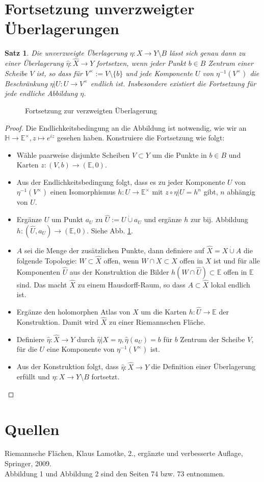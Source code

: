 \documentclass[12pt,a4paper]{article}
\theoremstyle{plain}
\newtheorem*{Satz}[Theorem]{Satz}
\newcommand{\cupdot}{\mathbin{\dot{\cup}}}
\numberwithin{equation}{section}
\begin{document}
\section*{Fortsetzung unverzweigter Überlagerungen}
\begin{Satz} Die unverzweigte Überlagerung $\eta: X\rightarrow Y\setminus B$ lässt sich genau dann zu einer Überlagerung $\hat{\eta}: \hat{X} \rightarrow Y$ fortsetzen, wenn jeder Punkt $b\in B$ Zentrum einer Scheibe $V$ ist, so dass für $V^\times:=V\setminus\{b\}$ und jede Komponente $U$ von $\eta^{-1}(V^\times)$ die Beschränkung $\eta|U: U\rightarrow V^\times$ endlich ist. Insbesondere existiert die Fortsetzung für jede endliche Abbildung $\eta$.
\end{Satz}
\begin{figure} \def\svgwidth{\textwidth}  \caption{Fortsetzung zur  verzweigten Überlagerung}\label{KVUe}
\end{figure}
\begin{proof}
Die Endlichkeitsbedingung an die Abbildung ist notwendig, wie wir an $\mathbb{H}\rightarrow \mathbb{E^\times}, z\mapsto e^{iz}$ gesehen haben. Konstruiere die Fortsetzung wie folgt:
\begin{itemize}
\item Wähle paarweise disjunkte Scheiben $V\subset Y$ um die Punkte in $b\in B$ und Karten $z:(V,b)\rightarrow (\mathbb{E},0)$.
\item Aus der Endlichkeitsbedingung folgt, dass es zu jeder Komponente $U$ von $\eta^{-1}(V^\times)$ einen Isomorphismus $h: U\rightarrow \mathbb{E}^\times$ mit $z\circ \eta|U = h^n$ gibt, $n$ abhängig von $U$.
\item Ergänze $U$ um Punkt $a_U$ zu $\hat{U}:=U\cupdot a_U$ und ergänze $h$ zur bij. Abbildung $h: (\hat{U},a_U) \rightarrow (\mathbb{E},0)$. Siehe Abb. \ref{KVUe}.
\item $A$ sei die Menge der zusätzlichen Punkte, dann definiere auf $\hat{X} = X \cupdot A$ die folgende Topologie: $W\subset \hat{X}$ offen, wenn $W\cap X \subset X$ offen in $X$ ist und für alle Komponenten $\hat{U}$ aus der Konstruktion die Bilder $h(W\cap \hat{U})\subset \mathbb{E}$ offen in $\mathbb{E}$ sind. Das macht $\hat{X}$ zu einem Hausdorff-Raum, so dass $A\subset \hat{X}$ lokal endlich ist.
\item Ergänze den holomorphen Atlas von $X$ um die Karten $h:\hat{U}\rightarrow \mathbb{E}$ der Konstruktion. Damit wird $\hat{X}$ zu einer Riemannschen Fläche.
\item Definiere $\hat{\eta}: \hat{X}\rightarrow Y$ durch $\hat{\eta}|X = \eta, \hat{\eta}(a_U)=b$ für $b$ Zentrum der Scheibe $V$, für die $U$ eine Komponente von $\eta^{-1}(V^\times)$ ist.
\item Aus der Konstruktion folgt, dass $\hat{\eta}:\hat{X}\rightarrow Y$ die Definition einer Überlagerung erfüllt und $\eta: X\rightarrow Y\setminus B$ fortsetzt.
\end{itemize}
\end{proof}
\section*{Quellen}
Riemannsche Flächen, Klaus Lamotke, 2., ergänzte und verbesserte Auflage, Springer, 2009.\\
Abbildung 1 und Abbildung 2 sind den Seiten 74 bzw. 73 entnommen.
\end{document}
